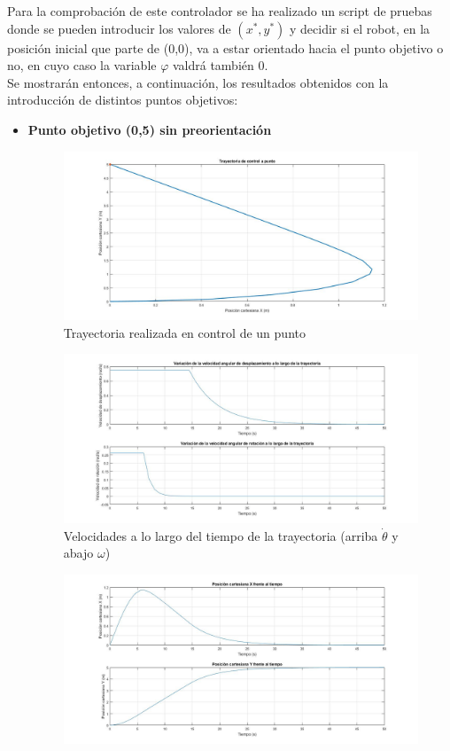 \documentclass[a4paper,twoside]{article}
\begin{document}
	Para la comprobación de este controlador se ha realizado un script de pruebas donde se pueden introducir los valores de $(x^*,y^*)$ y decidir si el robot, en la posición inicial que parte de (0,0), va a estar orientado hacia el punto objetivo o no, en cuyo caso la variable $\varphi$ valdrá también 0.\\
	Se mostrarán entonces, a continuación, los resultados obtenidos con la introducción de distintos puntos objetivos:\\
	\newpage
	\begin{itemize}
		\item \textbf{Punto objetivo (0,5) sin preorientación}
		\begin{figure}[h!]
		\centering
		\includegraphics[width=1\textwidth]{control_punto_1}
		\caption{Trayectoria realizada en control de un punto}
		\end{figure}
		\begin{figure}[h!]
			\centering
			\includegraphics[width=1\textwidth]{control_punto_1_2}
			\caption{Velocidades a lo largo del tiempo de la trayectoria (arriba $\dot{\theta}$ y abajo $\omega$)}
		\end{figure}
		\begin{figure}[h!]
		\centering
		\includegraphics[width=1\textwidth]{control_punto_1_3}

\end{figure}
\end{itemize}
\end{document}
